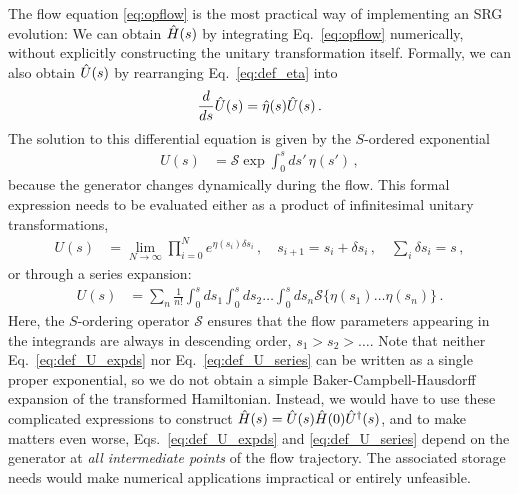 {The flow equation \eqref{eq:opflow} is the most practical way of implementing
an SRG evolution: We can obtain $\hat{H}(s)$ by integrating Eq.~\eqref{eq:opflow} 
numerically, without explicitly constructing the unitary transformation itself. 
Formally, we can also obtain $\hat{U}(s)$ by rearranging Eq.~\eqref{eq:def_eta} into
\begin{equation}\label{eq:Uflow}
  \totd{}{s}\UO(s) = \etaO(s)\UO(s)\,.
\end{equation}
The solution to this differential equation is given by the $S$-ordered 
exponential
\begin{align}
  U(s) &= \mathcal{S}\exp \int^s_0 ds'\,\eta(s') \label{eq:def_U_pathexp}\,,
\end{align}
because the generator changes dynamically during the flow. This formal expression 
needs to be evaluated either as a product of infinitesimal unitary transformations,
\begin{align}       \label{eq:def_U_expds}
   U(s) &= \lim_{N\to\infty}\prod^{N}_{i=0} e^{\eta(s_i)\delta s_i}\,,\quad s_{i+1}=s_i+\delta s_i\,,\quad \sum_{i}\delta s_i=s\,,
\end{align}
or through a series expansion:
\begin{align}     \label{eq:def_U_series}
   U(s) &= \sum_n \frac{1}{n!}\int^s_0 ds_1 \int^s_0 ds_2 \ldots 
          \int^s_0 ds_n \mathcal{S}\{\eta(s_1)\ldots\eta(s_n)\}\,.
\end{align}
Here, the $S$-ordering operator $\mathcal{S}$ ensures that the flow parameters 
appearing in the integrands are always in descending order,
$s_1 > s_2 > \ldots$. Note that neither Eq.~\eqref{eq:def_U_expds} nor Eq.~\eqref{eq:def_U_series} 
can be written as a single proper exponential, so we do not obtain
a simple Baker-Campbell-Hausdorff expansion of the transformed
Hamiltonian. Instead, we would have to use these complicated expressions 
to construct $\hat{H}(s)=\hat{U}(s)\hat{H}(0)\hat{U}^\dag(s)$, and to make matters even worse, Eqs.~\eqref{eq:def_U_expds}
and \eqref{eq:def_U_series} depend on the generator at \emph{all intermediate points} 
of the flow trajectory. The associated storage needs would make numerical applications
impractical or entirely unfeasible.

}
